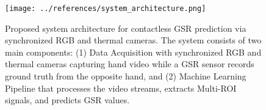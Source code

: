 




    \begin{figure}[ht]
        \centering
        \texttt{[image: ../references/system\_architecture.png]}
        \caption{Proposed system architecture for contactless GSR prediction via synchronized RGB and thermal cameras. The system consists of two main components: (1) Data Acquisition with synchronized RGB and thermal cameras capturing hand video while a GSR sensor records ground truth from the opposite hand, and (2) Machine Learning Pipeline that processes the video streams, extracts Multi-ROI signals, and predicts GSR values.}
        \label{fig:architecture}
    \end{figure}


